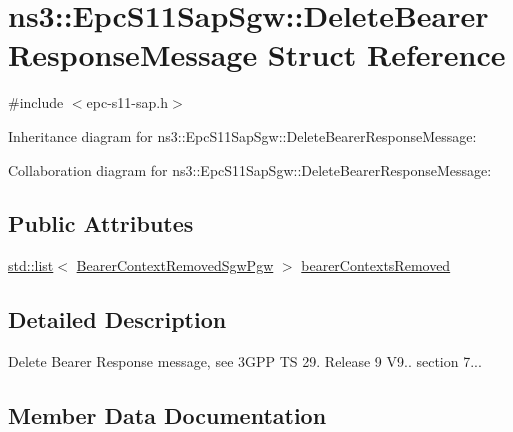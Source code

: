 \hypertarget{structns3_1_1EpcS11SapSgw_1_1DeleteBearerResponseMessage}{}\section{ns3\+:\+:Epc\+S11\+Sap\+Sgw\+:\+:Delete\+Bearer\+Response\+Message Struct Reference}
\label{structns3_1_1EpcS11SapSgw_1_1DeleteBearerResponseMessage}


{\ttfamily \#include $<$epc-\/s11-\/sap.\+h$>$}



Inheritance diagram for ns3\+:\+:Epc\+S11\+Sap\+Sgw\+:\+:Delete\+Bearer\+Response\+Message\+:


Collaboration diagram for ns3\+:\+:Epc\+S11\+Sap\+Sgw\+:\+:Delete\+Bearer\+Response\+Message\+:
\subsection*{Public Attributes}
\begin{DoxyCompactItemize}
\item 
\hyperlink{openflow-interface_8h_afd9bcfa176617760671b67580f536fa7}{std\+::list}$<$ \hyperlink{structns3_1_1EpcS11SapSgw_1_1BearerContextRemovedSgwPgw}{Bearer\+Context\+Removed\+Sgw\+Pgw} $>$ \hyperlink{structns3_1_1EpcS11SapSgw_1_1DeleteBearerResponseMessage_ab69c171c5dabf9d08da798d2268cf3c9}{bearer\+Contexts\+Removed}
\end{DoxyCompactItemize}


\subsection{Detailed Description}
Delete Bearer Response message, see 3\+G\+PP TS 29. Release 9 V9.. section 7... 

\subsection{Member Data Documentation}

